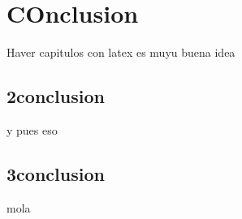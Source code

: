 \chapter{COnclusion}
Haver capitulos con latex es muyu buena idea
	\section{2conclusion}
	y pues eso
	\section{3conclusion}
	mola
